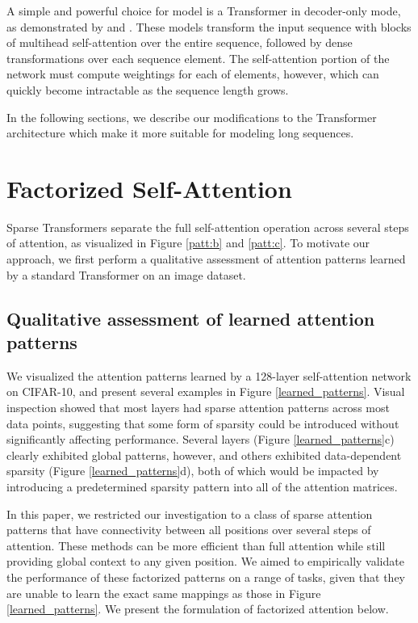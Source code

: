 \documentclass{article}
\begin{document}
A simple and powerful choice for model  is a Transformer \cite{vaswani2017attention} in decoder-only mode, as demonstrated by \cite{radford2018} and \cite{liu2018generating}. These models transform the input sequence with blocks of multihead self-attention over the entire sequence, followed by dense transformations over each sequence element. The self-attention portion of the network must compute  weightings for each of  elements, however, which can quickly become intractable as the sequence length grows.

In the following sections, we describe our modifications to the Transformer architecture which make it more suitable for modeling long sequences.

\section{Factorized Self-Attention}





Sparse Transformers separate the full self-attention operation across several steps of attention, as visualized in Figure \ref{patt:b} and \ref{patt:c}. To motivate our approach, we first perform a qualitative assessment of attention patterns learned by a standard Transformer on an image dataset.



\subsection{Qualitative assessment of learned attention patterns}
We visualized the attention patterns learned by a 128-layer self-attention network on CIFAR-10, and present several examples in Figure \ref{learned_patterns}. Visual inspection showed that most layers had sparse attention patterns across most data points, suggesting that some form of sparsity could be introduced without significantly affecting performance. Several layers (Figure \ref{learned_patterns}c) clearly exhibited global patterns, however, and others exhibited data-dependent sparsity (Figure \ref{learned_patterns}d), both of which would be impacted by introducing a predetermined sparsity pattern into all of the attention matrices.

In this paper, we restricted our investigation to a class of sparse attention patterns that have connectivity between all positions over several steps of attention. These methods can be more efficient than full attention while still providing global context to any given position. We aimed to empirically validate the performance of these factorized patterns on a range of tasks, given that they are unable to learn the exact same mappings as those in Figure \ref{learned_patterns}. We present the formulation of factorized attention below.
\end{document}

